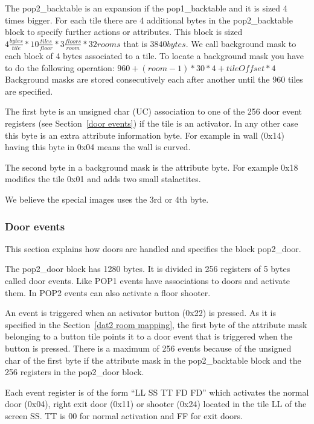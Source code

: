 \documentclass{article}
\begin{document}
 The pop2\_backtable is an expansion if the pop1\_backtable and it is sized
 4 times bigger. For each tile there are 4 additional bytes in the 
 pop2\_backtable block to specify further actions or attributes. This block
 is sized $4 \frac{bytes}{tile} * 10 \frac{tiles}{floor} * 3 \frac{floors}{room} * 32 rooms$ that is
 $3840 bytes$.
 We call background mask to each block of 4 bytes associated to a tile. To
 locate a background mask you have to do the following operation:
  $960+(room-1)*30*4+tileOffset*4$
 Background masks are stored consecutively each after another until the
 960 tiles are specified.
 
 The first byte is an unsigned char (UC) association to one of the 256 door
 event registers (see Section~\ref{door events}) if the tile is an activator.
 In any other case this byte is an extra attribute information byte.
 For example in wall (0x14) having this byte in 0x04 means the wall is
 curved.
 
 The second byte in a background mask is the attribute byte. For example
 0x18 modifies the tile 0x01 and adds two small stalactites.
 
 We believe the special images uses the 3rd or 4th byte.

\subsubsection{Door events \label{door events}} %
 This section explains how doors are handled and specifies the block
 pop2\_door.

 The pop2\_door block has 1280 bytes. It is divided in 256 registers of
 5 bytes called door events. Like POP1 events have associations to doors
 and activate them. In POP2 events can also activate a floor shooter.
 
 An event is triggered when an activator button (0x22) is pressed. As it is
 specified in the Section~\ref{dat2 room mapping}, the first byte of the attribute mask
 belonging to a button tile points it to a door event that is triggered
 when the button is pressed.
 There is a maximum of 256 events because of the unsigned char of the first
 byte if the attribute mask in the pop2\_backtable block and the 256
 registers in the pop2\_door block.

 Each event register is of the form ``LL SS TT FD FD'' which activates the
 normal door (0x04), right exit door (0x11) or shooter (0x24) located in
 the tile LL of the screen SS. TT is 00 for normal activation and FF for
 exit doors.
\end{document}
